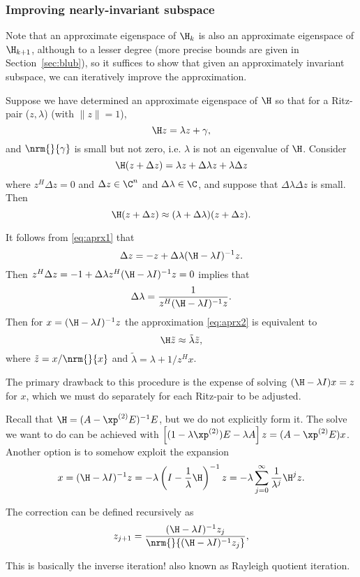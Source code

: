 \subsubsection {Improving nearly-invariant subspace}
 Note that an approximate eigenspace of $\H_k$  is also an approximate eigenspace of $\H_{k+1}$, although to a lesser degree   (more precise bounds are given in Section~\ref{sec:blub}), so it suffices to show that given an approximately invariant subspace, we can iteratively improve the approximation.  

\medskip 
Suppose we have determined an approximate eigenspace of $\H$ so that for a Ritz-pair ($z,\lambda$)   (with $\|z\|=1$),
\[
\H z = \lambda z + \gamma,
\]
and $\nrm{}{\gamma}$ is small but not zero, i.e. $\lambda$ is not an eigenvalue of $\H$.
Consider 
\begin{equation}
\H (z+\Delta z) = \lambda z + \Delta \lambda z + \lambda \Delta z
\label{eq:aprx1}
\end{equation}
where $z^H \Delta z = 0$ and  $\Delta z\in \C^n$ and $\Delta \lambda\in \C$, and suppose that $\Delta \lambda \Delta z$ is  small.  Then 
\begin{equation}
\H (z+\Delta z) \approx (\lambda+\Delta \lambda)(z + \Delta z).
\label{eq:aprx2}
\end{equation}

It follows from \eqref{eq:aprx1} that 
\begin{equation*}
\Delta z = -z + \Delta \lambda (\H-\lambda I)^{-1}z.
\end{equation*}
Then  $z^H \Delta z = -1 + \Delta \lambda z^H(\H-\lambda I)^{-1}z=0$ implies that 
\[
\Delta \lambda = \frac{1}{z^H(\H-\lambda I)^{-1}z}.
\]
Then for $x=(\H-\lambda I)^{-1}z$ the approximation \eqref{eq:aprx2} is equivalent to 
\begin{equation*}
\H \tilde{z} \approx \tilde{\lambda}\tilde{z},  
\end{equation*}
where $\tilde{z}=x/\nrm{}{x}$ and 
$ \tilde{\lambda}= \lambda + 1/z^H x$.

The primary drawback to this procedure is the expense of solving $(\H-\lambda I)x=z$ for $x$, which we must
do separately for each Ritz-pair to be adjusted.

  Recall that $\H = (A - \xp^{(2)} E)^{-1} E$, but we do not explicitly form it.  The solve we want to do can be achieved with $\left[(1-\lambda\xp^{(2)})E - \lambda A \right]z = (A - \xp^{(2)} E)x$. Another option is to somehow exploit the expansion
\[
x=(\H-\lambda I)^{-1}z = -\lambda\left(I-\frac{1}{\lambda}\H\right) ^{-1}z
=-\lambda \sum_{j=0}^\infty \frac{1}{\lambda^j}\H^j z.
\]

The correction can be defined recursively as 
\[
z_{j+1} =\frac{(\H-\lambda I)^{-1}z_j}{\nrm{}{(\H-\lambda I)^{-1}z_j}}, 
\]

This is basically the inverse iteration! also known as Rayleigh quotient iteration.

